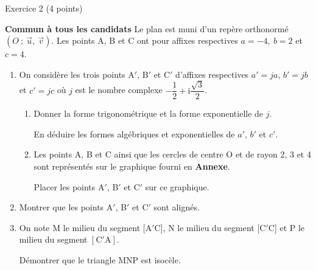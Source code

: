 
\begin{h2}Exercice 2 (4 points)\end{h2}
\textbf{Commun  à tous les candidats}
\medskip
Le plan est muni d'un repère orthonormé $(O~;~\overrightarrow{u},~\overrightarrow{v})$.
\smallskip
Les points A, B et C ont pour affixes respectives $a = -4,\: b = 2$ et $c = 4$.
\medskip
\begin{enumerate}
     \item On considère les trois points A$'$, B$'$ et C$'$ d'affixes respectives $a'= ja$, $b'= jb$ et $c'= jc$ où $j$ est le nombre complexe $-\dfrac{1}{2} + \text{i}\dfrac{\sqrt{3}}{2}$.
     \begin{enumerate}[label=\alph*.]
          \item Donner la forme trigonométrique et la forme exponentielle de $j$.
          \par
          En déduire les formes algébriques et exponentielles de $a'$, $b'$ et $c'$.
          \item Les points A, B et C ainsi que les cercles de centre O et de rayon 2, 3 et 4 sont
          représentés sur le graphique fourni en \textbf{Annexe}.
          \par
          Placer les points A$'$, B$'$ et C$'$ sur ce graphique.
     \end{enumerate}
     \item  Montrer que les points A$'$, B$'$ et C$'$ sont alignés.
     \item  On note M le milieu du segment [A$'$C], N le milieu du segment [C$'$C] et P le milieu du
     segment $[\text{C}'\text{A}]$.
     \par
     Démontrer que le triangle MNP est isocèle.
\end{enumerate}
